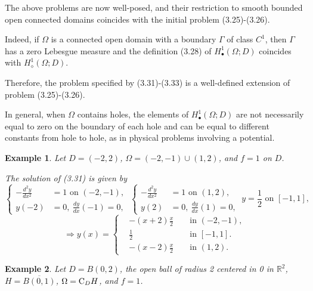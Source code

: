 \documentclass{book}
\numberwithin{equation}{section}
\newtheorem{example}{Example}[section]
\begin{document}
\begin{enumerate}
    The above problems are now well-posed, and their restriction to smooth bounded open connected domains coincides with the initial problem (3.25)-(3.26).
    
    Indeed, if $\Omega$ is a connected open domain with a boundary $\Gamma$ of class $C^1$, then $\Gamma$ has a zero Lebesgue measure and the definition (3.28) of $H_\bullet^1(\Omega;D)$ coincides with $H_\diamond^1(\Omega;D)$.
    
    Therefore, the problem specified by (3.31)-(3.33) is a well-defined extension of problem (3.25)-(3.26).
    
    In general, when $\Omega$ contains holes, the elements of $H_\bullet^1(\Omega;D)$ are not necessarily equal to zero on the boundary of each hole and can be equal to different constants from hole to hole, as in physical problems involving a potential.
    
    \begin{example}
        Let $D = (-2,2)$, $\Omega = (-2,-1)\cup(1,2)$, and $f = 1$ on $D$.
        
        The solution of (3.31) is given by
        \begin{equation*}
            \left\{\begin{split}
                -\frac{d^2y}{dx^2} &= 1 \mbox{ on } (-2,-1),\\
                y(-2) &= 0,\ \frac{dy}{dx}(-1) = 0,
            \end{split}\right.\
            \left\{\begin{split}
                -\frac{d^2y}{dx^2} &= 1 \mbox{ on } (1,2),\\
                y(2) &= 0,\ \frac{dy}{dx}(1) = 0,
            \end{split}\right.\ y = \frac{1}{2} \mbox{ on } [-1,1],
        \end{equation*}
        \begin{equation*}
            \Rightarrow y(x) = \left\{\begin{split}
                &-(x + 2)\frac{x}{2} &&\mbox{ in } (-2,-1),\\
                &\frac{1}{2} &&\mbox{ in } [-1,1].\\
                &-(x - 2)\frac{x}{2} &&\mbox{ in } (1,2).
            \end{split}\right.
        \end{equation*}
    \end{example}
    
    \begin{example}
        Let $D = B(0,2)$, the open ball of radius 2 centered in 0 in $\mathbb{R}^2$, $H = \overline{B(0,1)}$, $\Omega = {\rm C}_DH$, and $f = 1$.
        

\end{example}
\end{enumerate}
\end{document}

